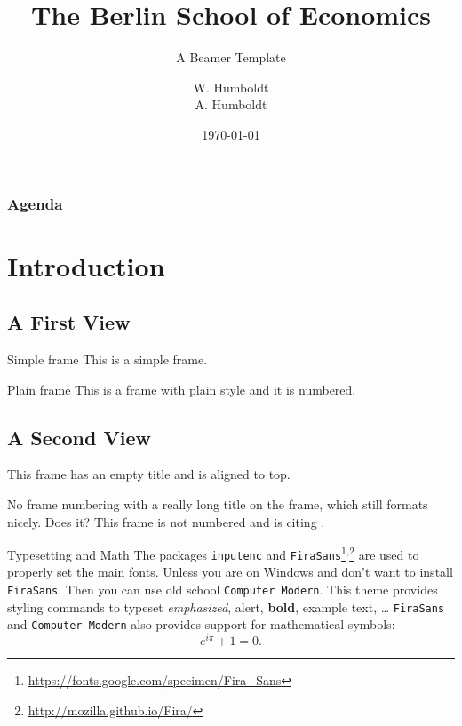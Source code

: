 \documentclass{beamer}
\title[Short Title]{The Berlin School of Economics}
\subtitle{A Beamer Template}
\author[Humboldt \& Humboldt]{W. Humboldt\texorpdfstring{\\}{,} A. Humboldt}
\institute{Berlin School of Economics\\ \footnotesize Conference XYZ}
\date{\today}
\begin{document}
    \begin{frame}
        \maketitle
    \end{frame}
    
    \begin{frame}[t]\frametitle{Agenda}
        \tableofcontents
    \end{frame}

    \section{Introduction}
    \subsection*{A First View}
    \begin{frame}{Simple frame}
        This is a simple frame.
    \end{frame}

    \begin{frame}[plain]{Plain frame}
        This is a frame with plain style and it is numbered.
    \end{frame}
    
    \subsection{A Second View}
    \begin{frame}[t]
        This frame has an empty title and is aligned to top.
    \end{frame}
    
    \begin{frame}[noframenumbering]{No frame numbering with a really long title on the frame, which still formats nicely. Does it?}
        This frame is not numbered and is citing \cite{knuth74}.
    \end{frame}
    
    \begin{frame}{Typesetting and Math}
        The packages \texttt{inputenc} and \texttt{FiraSans}\footnote{\url{https://fonts.google.com/specimen/Fira+Sans}}\textsuperscript{,}\footnote{\url{http://mozilla.github.io/Fira/}} are used to properly set the main fonts. Unless you are on Windows and don't want to install \texttt{FiraSans}. Then you can use old school \texttt{Computer Modern}.
        \vfill
        This theme provides styling commands to typeset \emph{emphasized}, \alert{alert}, \textbf{bold}, \textcolor{BSElightgreen}{example text}, \dots
        \vfill
        \texttt{FiraSans} and \texttt{Computer Modern} also provides support for mathematical symbols:
        \begin{equation*}
            e^{i\pi} + 1 = 0.
        \end{equation*}
    \end{frame}
\end{document}
